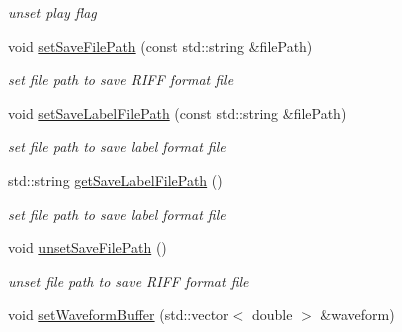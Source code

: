 \begin{DoxyCompactItemize}
\begin{DoxyCompactList}\small\item\em unset play flag \end{DoxyCompactList}\item 
\hypertarget{classsinsy_1_1SynthConditionImpl_adb799ad0576a025480dc05f29308e983}{void \hyperlink{classsinsy_1_1SynthConditionImpl_adb799ad0576a025480dc05f29308e983}{set\-Save\-File\-Path} (const std\-::string \&file\-Path)}\label{classsinsy_1_1SynthConditionImpl_adb799ad0576a025480dc05f29308e983}

\begin{DoxyCompactList}\small\item\em set file path to save \-R\-I\-F\-F format file \end{DoxyCompactList}\item 
\hypertarget{classsinsy_1_1SynthConditionImpl_ad432aebb654f006e0028d6193a3c13b2}{void \hyperlink{classsinsy_1_1SynthConditionImpl_ad432aebb654f006e0028d6193a3c13b2}{set\-Save\-Label\-File\-Path} (const std\-::string \&file\-Path)}\label{classsinsy_1_1SynthConditionImpl_ad432aebb654f006e0028d6193a3c13b2}

\begin{DoxyCompactList}\small\item\em set file path to save label format file \end{DoxyCompactList}\item 
std\-::string \hyperlink{classsinsy_1_1SynthConditionImpl_a2b2079d83850a92314fdf04e81ef058d}{get\-Save\-Label\-File\-Path} ()
\begin{DoxyCompactList}\small\item\em set file path to save label format file \end{DoxyCompactList}\item 
\hypertarget{classsinsy_1_1SynthConditionImpl_ae3117a16602776ab9f568c5a8569f455}{void \hyperlink{classsinsy_1_1SynthConditionImpl_ae3117a16602776ab9f568c5a8569f455}{unset\-Save\-File\-Path} ()}\label{classsinsy_1_1SynthConditionImpl_ae3117a16602776ab9f568c5a8569f455}

\begin{DoxyCompactList}\small\item\em unset file path to save \-R\-I\-F\-F format file \end{DoxyCompactList}\item 
\hypertarget{classsinsy_1_1SynthConditionImpl_a0b863171a387bbe20093da711341017a}{void \hyperlink{classsinsy_1_1SynthConditionImpl_a0b863171a387bbe20093da711341017a}{set\-Waveform\-Buffer} (std\-::vector$<$ double $>$ \&waveform)}\label{classsinsy_1_1SynthConditionImpl_a0b863171a387bbe20093da711341017a}


\end{DoxyCompactItemize}
